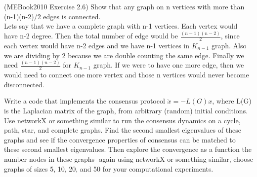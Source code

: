 \documentclass{article}
\begin{document}
\begin{problem}
    (MEBook2010 Exercise 2.6) Show that any graph on n vertices with more than (n-1)(n-2)/2 edges is connected.\\

    Lets say that we have a complete graph with n-1 vertices. Each vertex would have n-2 degree. Then the total number of edge would be $\frac {(n-1)(n-2)}{2}$, since each vertex would have n-2 edges and we have n-1 vertices in $K_{n-1}$ graph. Also we are dividing by 2 because we are double counting the same edge. Finally we need $\frac {(n-1)(n-2)}{2}$ for $K_{n-1}$ graph. If we were to have one more edge, then we would need to connect one more vertex and those n vertices would never become disconnected.
     
\end{problem}

\begin{problem}
    Write a code that implements the consensus protocol  $\dot{x}=-L(G) x$, where L(G) is the Laplacian matrix of the graph,  from arbitrary (random) initial conditions. Use networkX or something similar to run the consensus dynamics on a cycle, path, star, and complete graphs. Find the second smallest eigenvalues of these graphs and see if the convergence properties of consensus  can be matched to these second smallest eigenvalues. Then explore the convergence as a function the number  nodes in these graphs- again using networkX or something similar, choose graphs of sizes 5, 10, 20, and 50 for your computational experiments.
\end{problem}
\end{document}
